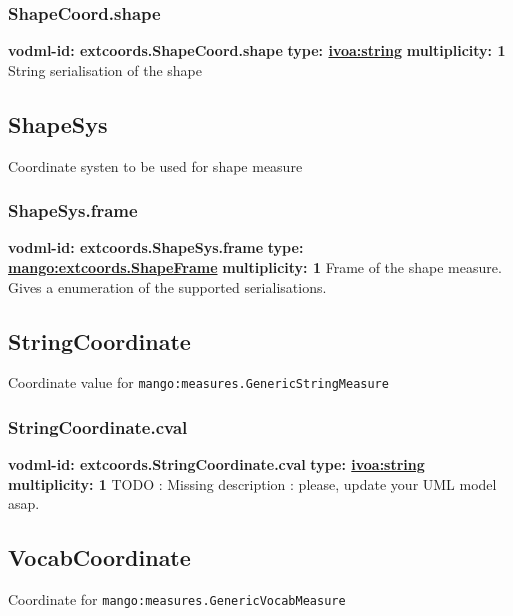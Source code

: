     \subsubsection{ShapeCoord.shape}
      \textbf{vodml-id: extcoords.ShapeCoord.shape} \newline
      \textbf{type: \hyperref[sect:ivoa]{ivoa:string}} \newline
      \textbf{multiplicity: 1} \newline 
      String serialisation of the shape

  \subsection{ShapeSys}
  \label{sect:extcoords.ShapeSys}
    Coordinate systen to be used for shape measure

    \subsubsection{ShapeSys.frame}
      \textbf{vodml-id: extcoords.ShapeSys.frame} \newline
      \textbf{type: \hyperref[sect:extcoords.ShapeFrame]{mango:extcoords.ShapeFrame}} \newline
      \textbf{multiplicity: 1} \newline 
      Frame of the shape measure. Gives a enumeration of the supported serialisations.

  \subsection{StringCoordinate}
  \label{sect:extcoords.StringCoordinate}
    Coordinate value for \texttt{mango:measures.GenericStringMeasure}

    \subsubsection{StringCoordinate.cval}
      \textbf{vodml-id: extcoords.StringCoordinate.cval} \newline
      \textbf{type: \hyperref[sect:ivoa]{ivoa:string}} \newline
      \textbf{multiplicity: 1} \newline 
      TODO : Missing description : please, update your UML model asap.

  \subsection{VocabCoordinate}
  \label{sect:extcoords.VocabCoordinate}
  Coordinate for \texttt{mango:measures.GenericVocabMeasure}

